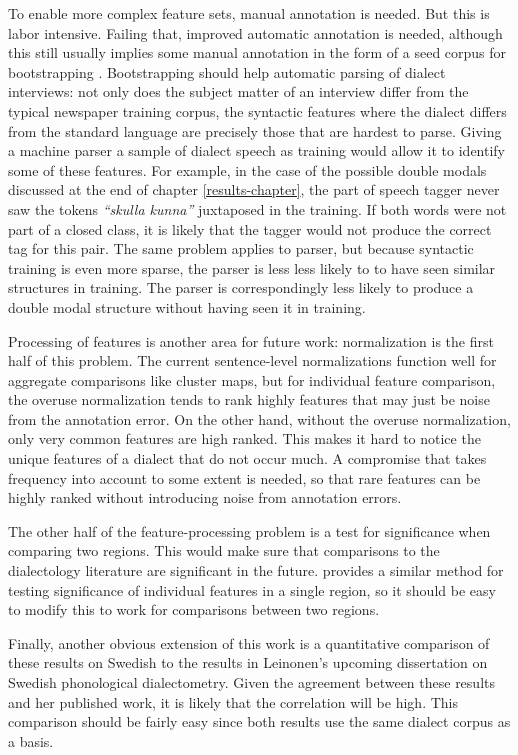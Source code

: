 To enable more complex feature sets, manual annotation is needed. But
this is labor intensive. Failing that, improved automatic annotation
is needed, although this still usually implies some manual annotation
in the form of a seed corpus for bootstrapping
\cite{blitzer07,mcdonald06}. Bootstrapping should help automatic
parsing of dialect interviews: not only does the subject matter of an
interview differ from the typical newspaper training corpus, the
syntactic features where the dialect differs from the standard
language are precisely those that are hardest to parse. Giving a
machine parser a sample of dialect speech as training would allow it
to identify some of these features. For example, in the case of the
possible double modals discussed at the end of chapter
\ref{results-chapter}, the part of speech tagger never saw the tokens
\textit{``skulla kunna''} juxtaposed in the training. If both words
were not part of a closed class, it is likely that the tagger would
not produce the correct tag for this pair. The same problem applies to
parser, but because syntactic training is even more sparse, the parser
is less less likely to to have seen similar structures in
training. The parser is correspondingly less likely to produce a
double modal structure without having seen it in training.

Processing of features is another area for future work: normalization
is the first half of this problem. The current sentence-level
normalizations function well for aggregate comparisons like cluster
maps, but for individual feature comparison, the overuse normalization
tends to rank highly features that may just be noise from the
annotation error. On the other hand, without the overuse
normalization, only very common features are high ranked. This makes
it hard to notice the unique features of a dialect that do not occur
much. A compromise that takes frequency into account to some extent is
needed, so that rare features can be highly ranked without introducing
noise from annotation errors.

The other half of the feature-processing problem is a test for
significance when comparing two regions. This would make sure that
comparisons to the dialectology literature are significant in the
future.  provides a similar method for testing
significance of individual features in a single region, so it should
be easy to modify this to work for comparisons between two regions.

Finally, another obvious extension of this work is a quantitative
comparison of these results on Swedish to the results in Leinonen's
upcoming dissertation on Swedish phonological dialectometry. Given the
agreement between these results and her published work, it is likely
that the correlation will be high. This comparison should be fairly
easy since both results use the same dialect corpus as a basis.

